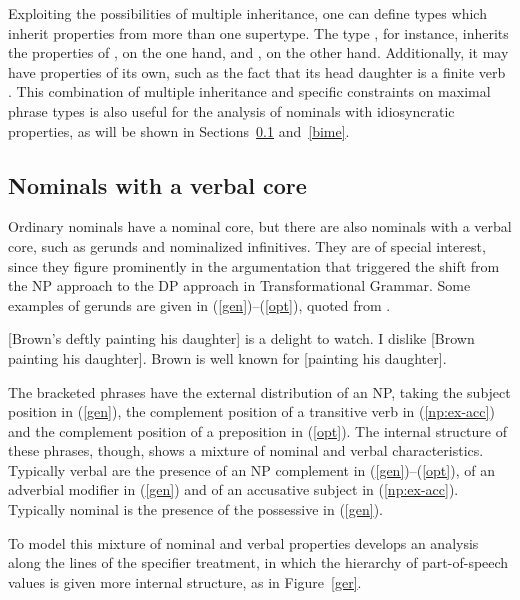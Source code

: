 \documentclass[output=paper
	        ,collection
	        ,collectionchapter
 	        ,biblatex
                ,babelshorthands
                ,newtxmath
                ,draftmode
                ,colorlinks, citecolor=brown
]{langscibook}
\begin{document}
Exploiting the possibilities of multiple inheritance, one can 
define types which inherit properties from more than one supertype. 
The type , for instance, inherits 
the properties of , on the one hand, and 
, on the other hand. Additionally, it may 
have properties of its own, such as the fact that its head daughter 
is a finite verb \citep[43]{GS00}. 
This combination of multiple inheritance and specific   
constraints on maximal phrase types is also useful for the analysis of 
nominals with idiosyncratic properties, as will be shown in Sections~\ref{geru} 
and~\ref{bime}. 


\subsection{Nominals with a verbal core} 
\label{geru}


Ordinary nominals have a nominal core, but there are also nominals  
with a verbal core, such as gerunds and nominalized infinitives. They are 
of special interest, since they figure prominently in the argumentation 
that triggered the shift from the NP approach to the DP approach in Transformational 
Grammar. Some examples of gerunds are given in (\ref{gen})--(\ref{opt}), 
quoted from \citet[1290]{Quirketal85}. 

\begin{exe} 
\ex\label{gen}  {}[Brown's deftly painting his daughter] is a delight to watch. 
\ex\label{np:ex-acc}  I dislike [Brown painting his daughter]. 
\ex\label{opt}  Brown is well known for [painting his daughter].
\end{exe}

\noindent
The bracketed phrases have the external distribution of an NP, 
taking the subject position in (\ref{gen}), 
the complement position of a transitive verb in (\ref{np:ex-acc}) and 
the complement position of a preposition in (\ref{opt}). 
The internal structure of these phrases, though, shows a mixture of nominal and verbal 
characteristics. 
Typically verbal are the presence of an NP complement in (\ref{gen})--(\ref{opt}), 
of an adverbial modifier in (\ref{gen}) and of an accusative subject in (\ref{np:ex-acc}). 
Typically nominal is the presence of the possessive in (\ref{gen}). 

To model this mixture of nominal and verbal properties \citet[65]{Malouf00} 
develops an analysis along the lines of the specifier treatment, in which 
the hierarchy of part-of-speech values is given more internal structure, as in 
Figure~\ref{ger}. 
\end{document}

